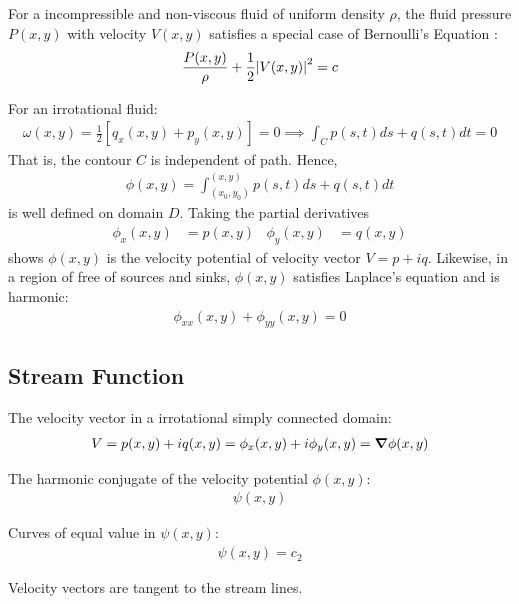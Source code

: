 \documentclass[12pt, english]{book}
\begin{document}
	For a incompressible and non-viscous fluid of uniform density \(\rho\), the fluid pressure \(P(x,y)\) with velocity \(V(x,y)\) satisfies a special case of Bernoulli's Equation : 
	\begin{align*}
		\frac{P(x,y)}{\rho} + \frac{1}{2} \abs{V(x,y)}^2 = c
	\end{align*}
	
	For an irrotational fluid:
	\begin{align*}
		\omega (x,y) =  \frac{1}{2} [q_x(x,y) + p_y(x,y)] = 0
		\implies \int_{C} p(s,t) ds + q(s,t) dt = 0
	\end{align*}
	That is, the contour \(C\) is independent of path. Hence,
	\begin{align*}
		\phi(x,y) = \int_{(x_0, y_0)}^{(x,y)} p(s,t) ds + q(s,t) dt
	\end{align*}
	is well defined on domain \(D\). Taking the partial derivatives
	\begin{align*}
		\phi_x(x,y) &= p(x,y) &
		\phi_y(x,y) &= q(x,y)
	\end{align*}
	shows \(\phi(x,y)\) is the velocity potential of velocity vector \(V = p + iq\).
	Likewise, in a region of free of sources and sinks, \(\phi(x,y)\) satisfies Laplace's equation and is harmonic:
	\begin{align*}
		\phi_{xx}(x,y) + \phi_{yy}(x,y) = 0
	\end{align*}
	
	\subsection{Stream Function} \label{Stream Function Subsection - Complex}
	
	The velocity vector in a irrotational simply connected domain:
	\begin{align*}
		V = p(x,y) + iq(x,y) = \phi_x(x,y) + i \phi_y(x,y) = \grad{\phi(x,y)}
	\end{align*}

	\begin{definition}
		\label{Stream Function Definition - Complex}
		The harmonic conjugate of the velocity potential \(\phi(x,y)\):
		\begin{align*}
			\psi(x,y)
		\end{align*}
	\end{definition}
	
	\begin{definition}[Streamlines]
		Curves of equal value in \(\psi(x,y)\):
		\begin{align*}
			\psi(x,y) = c_2
		\end{align*}
	\end{definition}
	Velocity vectors are tangent to the stream lines.
	
\end{document}
